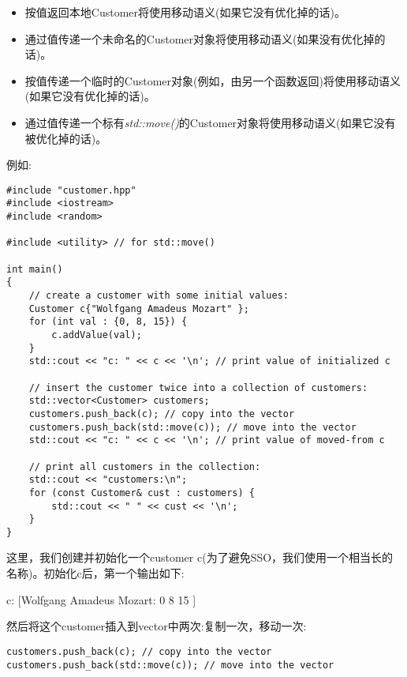 \begin{itemize}
	\item 按值返回本地Customer将使用移动语义(如果它没有优化掉的话)。
	\item 通过值传递一个未命名的Customer对象将使用移动语义(如果没有优化掉的话)。
	\item 按值传递一个临时的Customer对象(例如，由另一个函数返回)将使用移动语义(如果它没有优化掉的话)。
	\item 通过值传递一个标有\textit{std::move()}的Customer对象将使用移动语义(如果它没有被优化掉的话)。
\end{itemize}

例如:\par

{\color{red}{basics/customer1.cpp}}

\begin{lstlisting}[caption={}]
#include "customer.hpp"
#include <iostream>
#include <random>

#include <utility> // for std::move()

int main()
{
	// create a customer with some initial values:
	Customer c{"Wolfgang Amadeus Mozart" };
	for (int val : {0, 8, 15}) {
		c.addValue(val);
	}
	std::cout << "c: " << c << '\n'; // print value of initialized c
	
	// insert the customer twice into a collection of customers:
	std::vector<Customer> customers;
	customers.push_back(c); // copy into the vector
	customers.push_back(std::move(c)); // move into the vector
	std::cout << "c: " << c << '\n'; // print value of moved-from c
	
	// print all customers in the collection:
	std::cout << "customers:\n";
	for (const Customer& cust : customers) {
		std::cout << " " << cust << '\n';
	}
}
\end{lstlisting}

这里，我们创建并初始化一个customer c(为了避免SSO，我们使用一个相当长的名称)。初始化c后，第一个输出如下:\par

\begin{tcolorbox}[colback=white,colframe=black]
c: [Wolfgang Amadeus Mozart: 0 8 15 ]
\end{tcolorbox}

然后将这个customer插入到vector中两次:复制一次，移动一次:\par

\begin{lstlisting}[caption={}]
customers.push_back(c); // copy into the vector
customers.push_back(std::move(c)); // move into the vector
\end{lstlisting}

